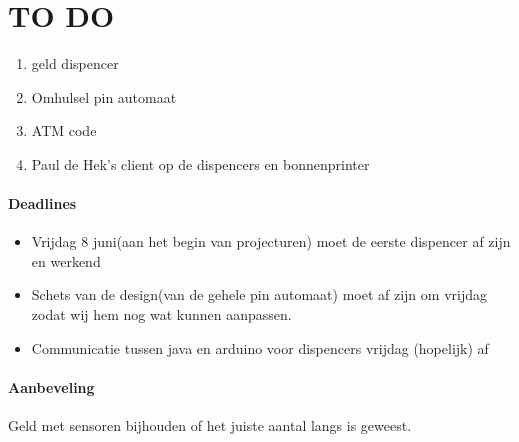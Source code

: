 \documentclass{article}
\begin{document}
\section{TO DO}
\begin{enumerate}
	\item geld dispencer
	\item Omhulsel pin automaat
	\item ATM code 
	\item Paul de Hek's client op de dispencers en bonnenprinter
\end{enumerate}

\paragraph{Deadlines}
\begin{itemize}
	\item Vrijdag 8 juni(aan het begin van projecturen)  moet de eerste dispencer af zijn en werkend
	\item Schets van de design(van de gehele pin automaat) moet af zijn om vrijdag zodat wij hem nog wat kunnen aanpassen.
	\item Communicatie tussen java en arduino voor dispencers vrijdag (hopelijk) af 	
\end{itemize}

\paragraph{Aanbeveling}
Geld met sensoren bijhouden of het juiste aantal langs is geweest. 
\end{document}

